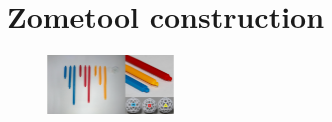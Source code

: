 \section{Zometool construction}
\label{sec:Zometool}




\begin{figure}
\centering
\includegraphics[width=0.3\textwidth]{figs/Zometool.pdf}
\label{fig:Zometool}
\end{figure}

